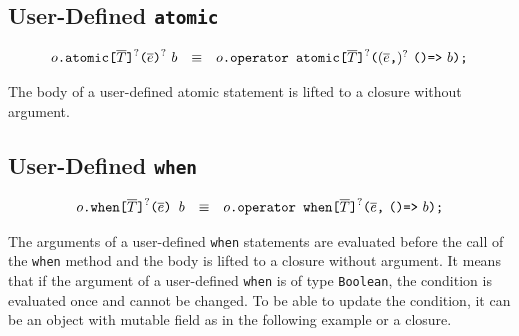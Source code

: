 \subsection{User-Defined \texttt{atomic}}

$$
\begin{array}{rcl}
  {o}\texttt{.atomic}\texttt{[}{\overline{T}}\texttt{]}^?\texttt{(}{\overline{e}}\texttt{)}^?~{b}
  & \equiv &
  {o}\texttt{.operator~atomic}\texttt{[}{\overline{T}}\texttt{]}^?\texttt{(} ({\overline{e}}\texttt{,})^?~ \texttt{()=>}~{b}\texttt{);}
\end{array}
$$

The body of a user-defined atomic statement is lifted to a closure without argument.

\subsection{User-Defined \texttt{when}}

$$
\begin{array}{rcl}
    {o}\texttt{.when}\texttt{[}{\overline{T}}\texttt{]}^?\texttt{(}{\overline{e}}\texttt{)~}{b}
    & \equiv &
    {o}\texttt{.operator~when}\texttt{[}{\overline{T}}\texttt{]}^?\texttt{(} {\overline{e}}\texttt{,}~ \texttt{()=>}~{b}\texttt{);}
\end{array}
$$

The arguments of a user-defined \verb+when+ statements are evaluated
before the call of the \verb+when+ method and the body is lifted to a
closure without argument. It means that if the argument of a
user-defined \verb+when+ is of type \verb+Boolean+, the condition is
evaluated once and cannot be changed. To be able to update the
condition, it can be an object with mutable field as in the following
example or a closure.


